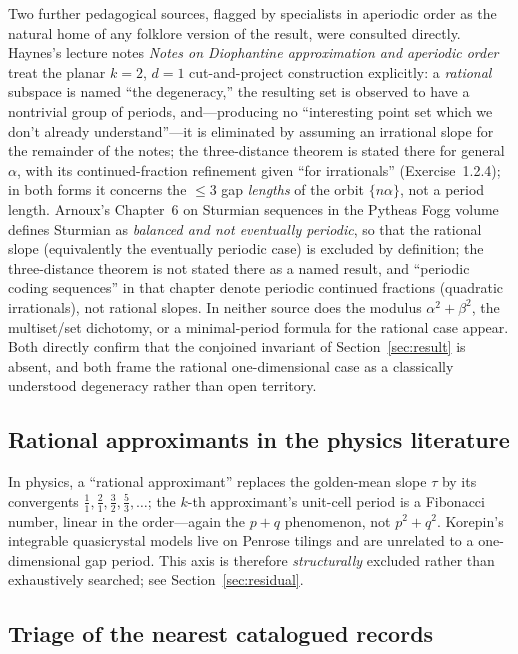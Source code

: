 \documentclass[11pt]{article}
\theoremstyle{plain}
\theoremstyle{remark}
\begin{document}
Two further pedagogical sources, flagged by specialists in aperiodic order as
the natural home of any folklore version of the result, were consulted
directly. Haynes's lecture notes \emph{Notes on Diophantine approximation and
aperiodic order}~\cite{HaynesNotes} treat the planar $k=2$, $d=1$
cut-and-project construction explicitly: a \emph{rational} subspace is named
``the degeneracy,'' the resulting set is observed to have a nontrivial group of
periods, and---producing no ``interesting point set which we don't already
understand''---it is eliminated by assuming an irrational slope for the
remainder of the notes; the three-distance theorem is stated there for general $\alpha$, with its
continued-fraction refinement given ``for irrationals'' (Exercise~1.2.4); in
both forms it concerns the $\le 3$ gap \emph{lengths} of the orbit
$\{n\alpha\}$, not a period length. Arnoux's Chapter~6 on Sturmian sequences in the Pytheas Fogg
volume~\cite{PytheasFogg2002} defines Sturmian as \emph{balanced and not eventually periodic}, so
that the rational slope (equivalently the eventually periodic case) is excluded
by definition; the three-distance theorem is not stated there as a named
result, and ``periodic coding sequences'' in that chapter denote periodic
continued fractions (quadratic irrationals), not rational slopes. In neither
source does the modulus $\alpha^2+\beta^2$, the multiset/set dichotomy, or a
minimal-period formula for the rational case appear. Both directly confirm that
the conjoined invariant of Section~\ref{sec:result} is absent, and both frame
the rational one-dimensional case as a classically understood degeneracy rather
than open territory.

\subsection{Rational approximants in the physics literature}

In physics, a ``rational approximant'' replaces the golden-mean slope $\tau$ by its
convergents $\tfrac11,\tfrac21,\tfrac32,\tfrac53,\dots$; the $k$-th approximant's
unit-cell period is a Fibonacci number, linear in the order---again the $p+q$
phenomenon, not $p^2+q^2$. Korepin's integrable quasicrystal models live on Penrose
tilings and are unrelated to a one-dimensional gap period. This axis is therefore
\emph{structurally} excluded rather than exhaustively searched; see
Section~\ref{sec:residual}.

\subsection{Triage of the nearest catalogued records}
\end{document}
